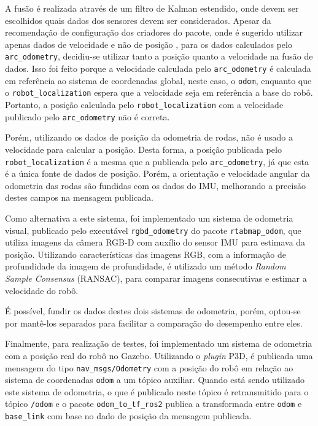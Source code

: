 \documentclass[repeatfields,xlists,xpacks,oneside,yearsonly]{ufrgscca}
\begin{document}
A fusão é realizada através de um filtro de Kalman estendido, onde
devem ser escolhidos quais dados dos sensores devem ser considerados.
Apesar da recomendação de configuração dos criadores do pacote, onde
é sugerido utilizar apenas dados de velocidade e não de posição
\cite{robot_localization_guide}, para os dados calculados pelo
\texttt{arc\_odometry}, decidiu-se utilizar tanto a posição quanto a
velocidade na fusão de dados. Isso foi feito porque a velocidade
calculada pelo \texttt{arc\_odometry} é calculada em referência ao
sistema de coordenadas global, neste caso, o \texttt{odom}, enquanto
que o \texttt{robot\_localization} espera que a velocidade seja em
referência a base do robô. Portanto, a posição calculada pelo
\texttt{robot\_localization} com a velocidade publicado pelo
\texttt{arc\_odometry} não é correta.

Porém, utilizando os dados de posição da odometria de rodas, não é
usado a velocidade para calcular a posição. Desta forma, a posição
publicada pelo \texttt{robot\_localization} é a mesma que a publicada
pelo \texttt{arc\_odometry}, já que esta é a única fonte de dados de
posição. Porém, a orientação e velocidade angular da odometria das
rodas são fundidas com os dados do IMU, melhorando a precisão destes
campos na mensagem publicada.


Como alternativa a este sistema, foi implementado um sistema de
odometria visual, publicado pelo executável \texttt{rgbd\_odometry}
do pacote \texttt{rtabmap\_odom}, que utiliza imagens da câmera RGB-D
com auxílio do sensor IMU para estimava da posição. Utilizando
características das imagens RGB, com a informação de profundidade da
imagem de profundidade, é utilizado um método \textit{Random Sample
    Consensus} (RANSAC), para comparar imagens consecutivas e estimar a
velocidade do robô\cite{rtabmap_odom}.

É possível, fundir os dados destes dois sistemas de odometria,
porém, optou-se por mantê-los separados para facilitar a comparação
do desempenho entre eles.

Finalmente, para realização de testes, foi implementado um sistema de
odometria com a posição real do robô no Gazebo. Utilizando o
\textit{plugin} P3D, é publicada uma mensagem do tipo
\texttt{nav\_msgs/Odometry} com a posição do robô em relação ao
sistema de coordenadas \texttt{odom} a um tópico auxiliar. Quando
está sendo utilizado este sistema de odometria, o que é publicado
neste tópico é retransmitido para o tópico \texttt{/odom} e o pacote
\texttt{odom\_to\_tf\_ros2} publica a transformada entre
\texttt{odom} e \texttt{base\_link} com base no dado de posição da
mensagem publicada.
\end{document}
